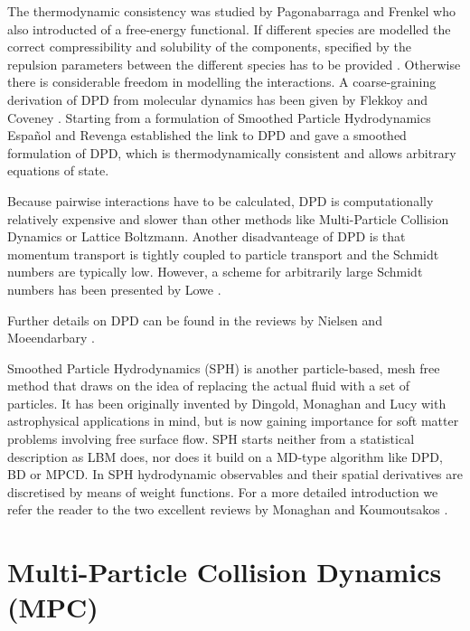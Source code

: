 \documentclass[8.5pt,twoside,twocolumn]{article}
\begin{document}
The thermodynamic consistency was studied by Pagonabarraga and Frenkel \cite{Pagonabarraga:2001} who also
introducted of a free-energy functional.
If different species are modelled the correct compressibility and solubility of the components, 
specified by the repulsion parameters between the different species has to be provided \cite{Groot:1997}.
Otherwise there is considerable freedom in modelling the interactions.
A coarse-graining derivation of DPD from molecular dynamics has been given by 
Flekkoy and Coveney \cite{Flekkoy:1999, Flekkoy:2000}. Starting from a 
formulation of Smoothed Particle Hydrodynamics Espa\~nol and Revenga \cite{Espanol:2003} 
established the link to DPD and gave a smoothed formulation of DPD, which 
is thermodynamically consistent and allows arbitrary equations of state. 

Because pairwise interactions have to be calculated, DPD is computationally relatively expensive and  
slower than other methods like Multi-Particle Collision Dynamics or Lattice Boltzmann.
Another disadvanteage of DPD is that momentum transport is tightly coupled to particle transport and the Schmidt numbers 
are typically low. However, a scheme for arbitrarily large Schmidt numbers has been presented by Lowe \cite{Lowe:2004}.

Further details on DPD can be found in the reviews by Nielsen \cite{Nielsen:2004} and 
Moeendarbary \cite{Moeendarbary:2009, Moeendarbary:2010}.


Smoothed Particle Hydrodynamics (SPH) is another particle-based, mesh free method
that draws on the idea of replacing the actual fluid with a set of particles.
It has been originally invented by Dingold, Monaghan and Lucy
with astrophysical applications in mind, but is now gaining importance for soft matter
problems involving free surface flow.
SPH starts neither from a statistical description as LBM does, nor does it
build on a MD-type algorithm like DPD, BD or MPCD. In SPH hydrodynamic observables 
and their spatial derivatives are discretised by means of 
weight functions. For a more detailed introduction we refer the reader to the two
excellent reviews by Monaghan \cite{Monaghan:2012} and Koumoutsakos \cite{Koumoutsakos:2005}.


\clearpage

\section{Multi-Particle Collision Dynamics (MPC)}
\end{document}
